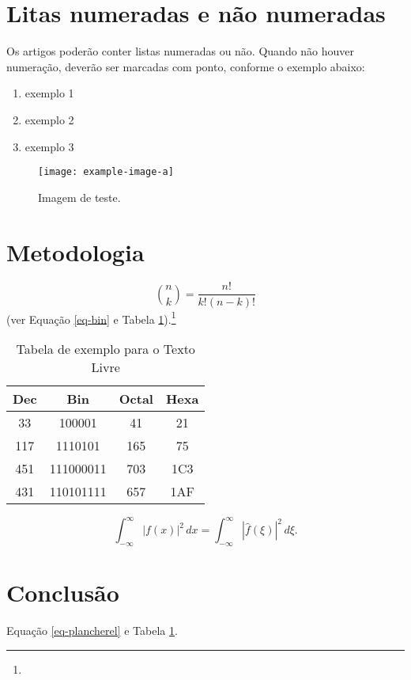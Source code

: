 \documentclass[red]{textolivre}
\begin{document}
\section{Litas numeradas e não numeradas}
Os artigos poderão conter listas numeradas ou não. Quando não houver numeração, deverão ser marcadas com ponto, conforme o exemplo abaixo: 
\begin{enumerate}
\item exemplo 1
\item exemplo 2
\item exemplo 3
\end{enumerate}

\begin{quoting}
\lipsum[11] 
\end{quoting}

\lipsum[1-10]
\lipsum[11][1-2]\cite{donaldknuth1984,leslielamport1994}\lipsum[11][3-5]

\begin{figure}[htbp]
 \centering
 \texttt{[image: example-image-a]}
 \caption{Imagem de teste.}
 \label{fig-img-a}
\end{figure}

\lipsum[12]

\section{Metodologia}
\lipsum[13-14]
\begin{equation}\label{eq-bin}
\binom{n}{k} = \frac{n!}{k!(n-k)!}
\end{equation}
\lipsum[15] (ver Equação \ref{eq-bin} e Tabela \ref{tab-exemplo}).\footnote{\lipsum[30]}

\begin{table}[htbp]
\centering
\caption{Tabela de exemplo para o Texto Livre}\label{tab-exemplo}
\begin{tabular}{cccc}
\toprule
  Dec  & Bin       & Octal & Hexa \\
\midrule  
  33   & 100001    &  41   & 21   \\
\midrule
  117  & 1110101   & 165   & 75   \\
\midrule
  451  & 111000011 & 703   & 1C3  \\
\midrule
  431  & 110101111 & 657   & 1AF  \\
\bottomrule
\end{tabular}
\end{table}

\lipsum[16]

\begin{equation}\label{eq-plancherel}
\int_{-\infty}^\infty \left| f(x) \right|^2\,dx = \int_{-\infty}^\infty \left| \hat{f}(\xi) \right|^2\,d\xi.
\end{equation}

\lipsum[20-21]

\section{Conclusão}
\lipsum[17-19]
Equação \ref{eq-plancherel} e Tabela \ref{tab-exemplo}.
\lipsum[18]


\printbibliography[title=Refer\^{e}ncias]
\end{document}
